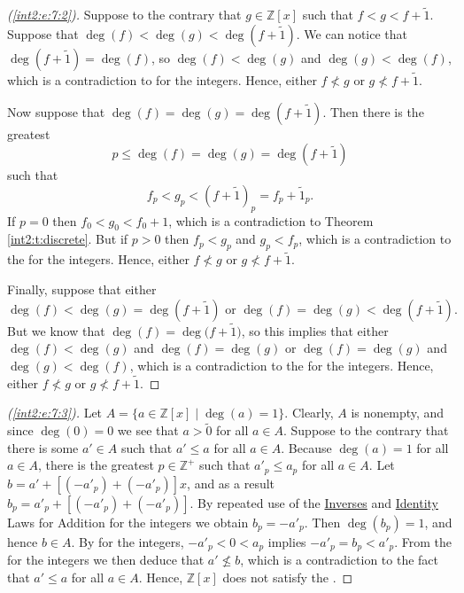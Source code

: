 \begin{proof}[(\ref{int2:e:7:2})]
	Suppose to the contrary that $g \in \mathbb{Z}[x]$ such that $f < g < f + \widetilde{1}$. Suppose that $\deg(f) < \deg(g) < \deg(f + \widetilde{1})$. We can notice that $\deg(f + \widetilde{1}) = \deg(f)$, so $\deg(f) < \deg(g)$ and $\deg(g) < \deg(f)$, which is a contradiction to  for the integers. Hence, either $f \not< g$ or $g \not< f + \widetilde{1}$.

	Now suppose that $\deg(f) = \deg(g) = \deg(f + \widetilde{1})$. Then there is the greatest
	\[
		p \leq \deg(f) = \deg(g) = \deg(f + \widetilde{1})
	\]
	such that
	\[
		f_p < g_p < (f + \widetilde{1})_p = f_p + \widetilde{1}_p.
	\]
	If $p = 0$ then $f_0 < g_0 < f_0 + 1$, which is a contradiction to Theorem \ref{int2:t:discrete}. But if $p > 0$ then $f_p < g_p$ and $g_p < f_p$, which is a contradiction to the  for the integers. Hence, either $f \not< g$ or $g \not< f + \widetilde{1}$.

	Finally, suppose that either
	\[
		\deg(f) < \deg(g) = \deg(f + \widetilde{1}) \text{ or } \deg(f) = \deg(g) < \deg(f + \widetilde{1}).
	\]
	But we know that ${\deg(f) = \deg(f + \widetilde{{1}}})$, so this implies that either $\deg(f) < \deg(g)$ and $\deg(f) = \deg(g)$ or $\deg(f) = \deg(g)$ and $\deg(g) < \deg(f)$, which is a contradiction to the  for the integers. Hence, either $f \not< g$ or $g \not< f + \widetilde{1}$.
\end{proof}

\begin{proof}[(\ref{int2:e:7:3})]
	Let $A = \{ a \in \mathbb{Z}[x] \mid \deg(a) = 1 \}$. Clearly, $A$ is nonempty, and since $\deg(0) = 0$ we see that $a > \widetilde{0}$ for all $a \in A$. Suppose to the contrary that there is some $a' \in A$ such that $a' \leq a$ for all $a \in A$. Because $\deg(a) = 1$ for all $a \in A$, there is the greatest $p \in \mathbb{Z}^{+}$ such that $a'_p \leq a_p$ for all $a \in A$. Let $b = a' + [(-a'_p) + (-a'_p)]x$, and as a result $b_p = a'_p + [(-a'_p) + (-a'_p)]$. By repeated use of the \hyperref[int2:d:oid:inverses_add]{Inverses} and \hyperref[int2:d:oid:identity_add]{Identity} Laws for Addition for the integers we obtain $b_p = -a'_p$. Then $\deg(b_p) = 1$, and hence $b \in A$. By  for the integers, $-a'_p < 0 < a_p$ implies $-a'_p = b_p < a'_p$. From the  for the integers we then deduce that $a' \not\leq b$, which is a contradiction to the fact that $a' \leq a$ for all $a \in A$. Hence, $\mathbb{Z}[x]$ does not satisfy the .
\end{proof}


